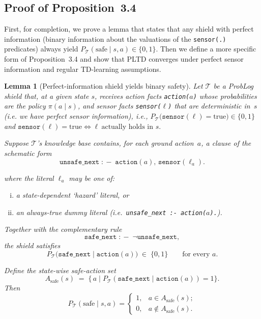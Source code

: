 \documentclass{ecai}
\theoremstyle{plain}
\newtheorem{lemma}[theorem]{Lemma}
\theoremstyle{definition}
\theoremstyle{remark}
\begin{document}
\subsection{Proof of Proposition~3.4}
First, for completion, we prove a lemma that states that any shield with perfect information (binary information about the valuations of the \verb|sensor(.)| predicates) always yield $P_{\mathcal{T}}(\text{safe}\mid s,a)\in\{0,1\}$. Then we define a more specific form of Proposition~3.4 and show that PLTD converges under perfect sensor information and regular TD-learning assumptions.
\begin{lemma}[Perfect-information shield yields binary safety]
\label{lem:perfect_info}
Let $\mathcal{T}$ be a ProbLog shield that, at a given state $s$, receives action facts \texttt{action($a$)} whose probabilities are the policy $\pi(a\mid s)$, and sensor facts \texttt{sensor($\ell$)} that are \emph{deterministic} in~$s$ (i.e. we have perfect sensor information), i.e., $P_\mathcal{T}\!\bigl(\texttt{sensor}(\ell)=\mathrm{true}\bigr)\in\{0,1\}$ and   $\texttt{sensor}(\ell)=\mathrm{true}\iff
  \ell\ \text{actually holds in }s.$

\noindent Suppose $\mathcal{T}$’s knowledge base contains, for each ground
action~$a$, a clause of the schematic form
\begin{equation}
  \texttt{unsafe\_next} \;:\!-\;
      \texttt{action}(a),\,\texttt{sensor}(\ell_a).    
\end{equation}

\noindent where the literal $\ell_a$ may be one of:
\begin{enumerate}[i.]
  \setlength{\itemsep}{0pt}
  \setlength{\parskip}{0pt}
  \item a state-dependent `hazard' literal, or  
  \item an always-true dummy literal (i.e.\ \texttt{unsafe\_next :- action($a$).}).
\end{enumerate}
Together with the complementary rule $$\texttt{safe\_next} \;:\!-\; \lnot\texttt{unsafe\_next},$$the shield satisfies  
\begin{equation}
  P_{\mathcal{T}}\!
  \bigl(\texttt{safe\_next}\mid \texttt{action}(a)\bigr)
  \;\in\;\{0,1\}\qquad\text{for every }a.
\end{equation}

\noindent Define the \emph{state-wise safe-action set}
\begin{equation}
  A_{\mathrm{safe}}(s)\;=\;
  \bigl\{\,a\mid
        P_{\mathcal{T}}(\texttt{safe\_next}\mid\texttt{action}(a))=1
  \bigr\}.
\end{equation}
Then
\begin{equation}
  P_{\mathcal{T}}(\text{safe}\mid s,a)=
  \begin{cases}
    1,& a\in A_{\mathrm{safe}}(s);\\[4pt]
    0,& a\notin A_{\mathrm{safe}}(s).
  \end{cases}
\end{equation}
\end{lemma}
\end{document}

